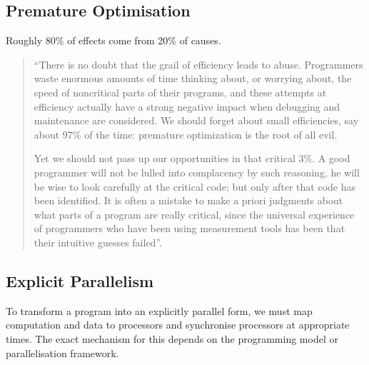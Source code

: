 \documentclass{article}
\newenvironment{aside}[1][]
  {\begin{mdframed}[style=0,%
      leftline=false,rightline=false,leftmargin=2em,rightmargin=2em,%
          innerleftmargin=0pt,innerrightmargin=0pt,linewidth=0.75pt,%
      skipabove=7pt,skipbelow=7pt,#1]\small}
  {\end{mdframed}}
\begin{document}
\subsection{Premature Optimisation}
\begin{aside}
    Roughly 80\% of effects come from 20\% of causes.

\end{aside}
\begin{quote}
    ``There is no doubt that the grail of efficiency leads to abuse.
    Programmers waste enormous amounts of time thinking about, or worrying
    about, the speed of noncritical parts of their programs, and these
    attempts at efficiency actually have a strong negative impact when
    debugging and maintenance are considered. We should forget about small
    efficiencies, say about 97\% of the time: premature optimization is the
    root of all evil.

    Yet we should not pass up our opportunities in that critical 3\%. A
    good programmer will not be lulled into complacency by such
    reasoning, he will be wise to look carefully at the critical code;
    but only after that code has been identified. It is often a mistake
    to make a priori judgments about what parts of a program are really
    critical, since the universal experience of programmers who have
    been using measurement tools has been that their intuitive guesses
    failed''.

\end{quote}
\subsection{Explicit Parallelism}
To transform a program into an explicitly parallel form, we must map
computation and data to processors and synchronise processors at
appropriate times. The exact mechanism for this depends on the
programming model or parallelisation framework.
\end{document}
